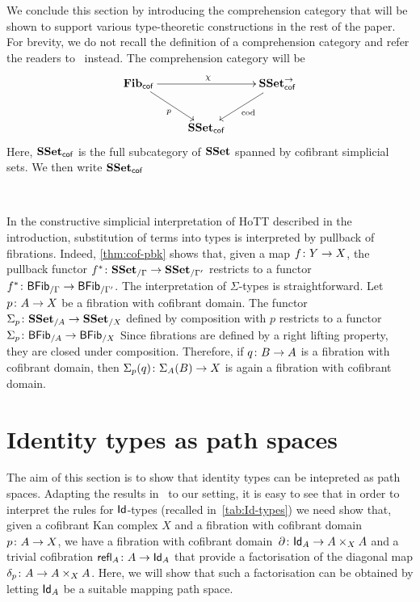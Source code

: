 \documentclass[reqno,10pt,a4paper,oneside,draft]{amsart}
\begin{document}
\begin{remark} We conclude this section by introducing the comprehension category that will be 
shown to support various type-theoretic constructions in the rest of the paper. For brevity, we do not recall
the definition of a comprehension category and refer the readers to~\cite{JacobsB:catltt} instead. The comprehension category will be
\[
\xymatrix{
\mathbf{Fib}_{ \mathsf{cof}} \ar[dr]_{p} \ar[rr]^{\chi} & & \SSet^{\to}_{\mathsf{cof}} \ar[dl]^{\mathrm{cod}} \\ 
 & \SSet_{\mathsf{cof}} &  }
 \]
Here, $\mathbf{SSet}_{\mathsf{cof}}$ is the full subcategory of $\mathbf{SSet}$ spanned by cofibrant simplicial sets. We then
write $\mathbf{SSet}_{\mathsf{cof}}$
 

\

In the constructive simplicial interpretation of HoTT described in the introduction, substitution of terms into types 
is interpreted by pullback of fibrations. Indeed, \cref{thm:cof-pbk} shows that, given a map $f \colon Y \to X$,  the pullback functor $f^* \colon \mathbf{SSet}_{/\Gamma} \to \mathbf{SSet}_{/\Gamma'}$ restricts to a functor $f^* \colon \mathsf{BFib}_{/\Gamma}  \to \mathsf{BFib}_{/\Gamma'}$. The interpretation of $\Sigma$-types is straightforward. 
Let  $p \colon A \to X$ be a fibration with cofibrant domain. The
functor~$\Sigma_p \colon \mathbf{SSet}_{/A} \to \mathbf{SSet}_{/X}$ defined by
composition with $p$ restricts to a functor
$\Sigma_p \colon \mathsf{BFib}_{/A}  \to \mathsf{BFib}_{/X}$
 Since fibrations are defined by a right lifting property, they are closed
under composition. Therefore, if $q \colon B \to A$ is a fibration with cofibrant domain, then
$\Sigma_p(q) \colon \Sigma_A(B) \to X$ is again a fibration with cofibrant domain.
\end{remark} 




\section{Identity types as path spaces}
\label{sec:pats}

The aim of this section is to show that identity types can be intepreted as path spaces. Adapting
the results in~\cite{awodey-warren:homotopy-idtype} to our setting, it is easy to see that 
 in order to interpret the rules for $\mathsf{Id}$-types (recalled in~\cref{tab:Id-types}) we need show that, given a  cofibrant Kan complex $X$ and a fibration with cofibrant domain $p \colon A \to X$,
we have a fibration with cofibrant domain~$\partial \colon \mathsf{Id}_A \to A \times_X A$ and a trivial cofibration
$\mathsf{refl}_A \colon A \to \mathsf{Id}_A$ that provide a factorisation of the diagonal map $\delta_p \colon A \to A \times_X A$. Here, we will show that such a factorisation can be obtained by letting $\mathsf{Id}_A$ be a suitable mapping path space. 
\end{document}

